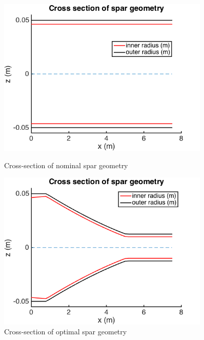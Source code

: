 \documentclass[11pt]{article}
\begin{document}
\begin{figure}[hbt]
\centering
\begin{minipage}[b]{0.4\textwidth}
\includegraphics[width=0.9\textwidth]{nominal_geom}
\caption{Cross-section of nominal spar geometry}
\label{fig:nominal_geom}
\end{minipage}
\begin{minipage}[b]{0.4\textwidth}
\includegraphics[width=0.9\textwidth]{optimal_geom}
\caption{Cross-section of optimal spar geometry}
\label{fig:optimal_geom}
\end{minipage}
\end{figure}
\end{document}
